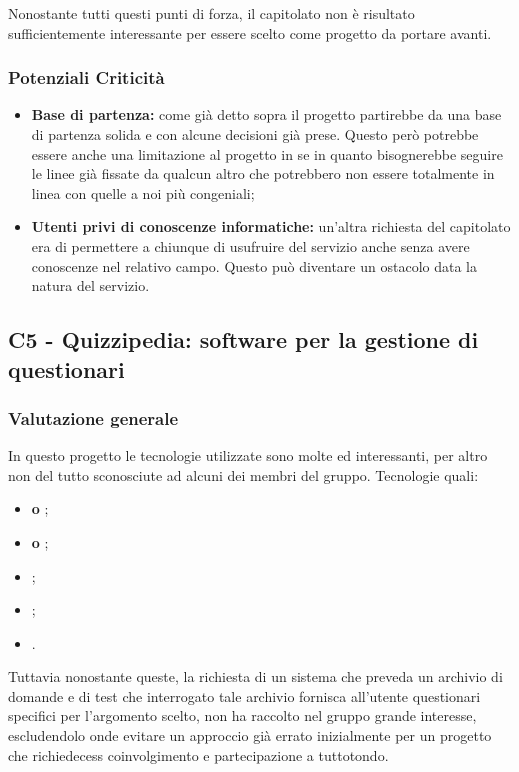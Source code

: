 Nonostante tutti questi punti di forza, il capitolato non è risultato sufficientemente interessante per essere scelto come progetto da portare avanti.

\subsubsection{Potenziali Criticità}

\begin{itemize}
	\item \textbf{Base di partenza:} come già detto sopra il progetto partirebbe da una base di partenza solida e con alcune decisioni già prese. Questo però potrebbe essere anche una limitazione al progetto in se in quanto bisognerebbe seguire le linee già fissate da qualcun altro che potrebbero non essere totalmente in linea con quelle a noi più congeniali;
\end{itemize}

\begin{itemize}
	\item \textbf{Utenti privi di conoscenze informatiche:} un'altra richiesta del capitolato era di permettere a chiunque di usufruire del servizio anche senza avere conoscenze nel relativo campo. Questo può diventare un ostacolo data la natura del servizio.
\end{itemize}


\subsection{C5 - Quizzipedia: software per la gestione di questionari}
\subsubsection{Valutazione generale}
In questo progetto le tecnologie utilizzate sono molte ed interessanti, per altro non del tutto sconosciute ad alcuni dei membri del gruppo.
Tecnologie quali:
 \begin{itemize}
	\item \textbf{ o };
	\item\textbf{ o };
	\item \textbf{};
	\item \textbf{};
	\item \textbf{}.
\end{itemize}
Tuttavia nonostante queste, la richiesta di un sistema che preveda un archivio di domande e di test che interrogato tale archivio fornisca all'utente questionari specifici per l'argomento scelto, non ha raccolto nel gruppo grande interesse, escludendolo onde evitare un approccio gi\`a errato inizialmente per un progetto che richiedecess coinvolgimento e partecipazione a tuttotondo.


